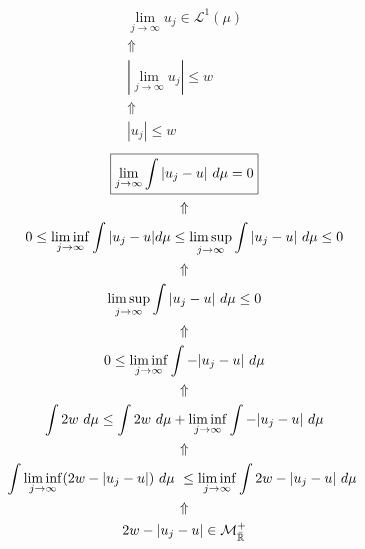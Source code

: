 \begin{minipage}[t]{0.55\textwidth}
\vspace{-0.1in}
\begin{gather*}
\boxed{\lim_{j\rightarrow \infty }u_{j} \in \mathcal{L}^1(\mu )} \\
\Uparrow  \\
|\lim_{j\rightarrow \infty }u_{j}|\leq w \\
\Uparrow  \\
|u_{j}|\leq w
\end{gather*}
\begin{gather*}
\boxed{\lim_{j\rightarrow \infty } \int |u_{j}-u|\  d\mu =0} \\
\Uparrow  \\
0\leq  \liminf_{j\rightarrow \infty } \int |u_{j}-u| d\mu  \leq  \limsup _{j\rightarrow \infty } \int  |u_{j}-u|\  d\mu \leq 0 \\
\Uparrow  \\
\limsup _{j\rightarrow \infty } \int  |u_{j}-u|\  d\mu \leq 0 \\
\Uparrow  \\
0\leq \liminf _{j\rightarrow \infty } \int - |u_{j}-u|\  d\mu  \\
\Uparrow  \\
\int 2w\  d\mu  \leq  \int 2w\  d\mu  + \liminf _{j\rightarrow \infty } \int  -|u_{j}-u|\  d\mu  \\
\Uparrow  \\
\int  \liminf _{j\rightarrow \infty } (2w - |u_{j}-u|)\  d\mu \  \leq \liminf _{j\rightarrow \infty }\int 2w - |u_{j}-u|\  d\mu \   \\
\Uparrow  \\
2w - |u_{j}-u|\in \mathcal{M}_{\bar{\Bbb{R}}}^+
\end{gather*}

\end{minipage}

\noindent\makebox[\linewidth]{\rule{\paperwidth}{0.4pt}}

